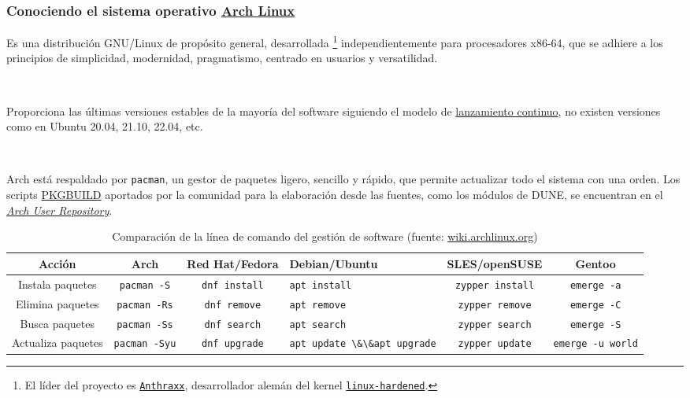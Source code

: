 \begin{frame}
	\frametitle{Conociendo el sistema operativo \href{https://archlinux.org}{Arch Linux}}

	Es una distribución GNU/Linux de propósito general, desarrollada
	\footnote{
		El líder del proyecto es
		\href{https://wiki.archlinux.org/title/User:Anthraxx}{\texttt{Anthraxx}},
		desarrollador alemán del kernel
		\href{https://github.com/anthraxx/linux-hardened}{\texttt{linux-hardened}}.
	}
	independientemente para procesadores x86-64, que se adhiere a los
	principios de simplicidad, modernidad, pragmatismo, centrado en
	usuarios y versatilidad.

	\

	Proporciona las últimas versiones estables de la mayoría del
	software siguiendo el modelo de
	\href{https://en.wikipedia.org/wiki/Rolling\_release}{lanzamiento continuo},
	no existen versiones como en Ubuntu 20.04, 21.10, 22.04, etc.

	\

	Arch está respaldado por \lstinline{pacman}, un gestor de
	paquetes ligero, sencillo y rápido, que permite actualizar todo
	el sistema con una orden.
	Los scripts
	\href{https://wiki.archlinux.org/title/PKGBUILD}{PKGBUILD}
	aportados por la comunidad para la elaboración desde las fuentes,
	como los módulos de DUNE, se encuentran en el
	\href{http://aur.archlinux.org}{\emph{Arch User Repository}}.

	\begin{table}[ht!]
		\caption{Comparación de la línea de comando del gestión de software (fuente: \url{wiki.archlinux.org})}
		\centering\footnotesize
		\begin{tabular}{cccp{50pt}cc}
			\toprule
			Acción             & Arch                    & Red Hat/Fedora          & Debian/Ubuntu                                              & SLES/openSUSE              & Gentoo
			\tabularnewline
			\midrule
			Instala paquetes   & \lstinline|pacman -S|   & \lstinline|dnf install| & \lstinline|apt install|                                    & \lstinline|zypper install| & \lstinline|emerge -a|
			\tabularnewline
			Elimina paquetes   & \lstinline|pacman -Rs|  & \lstinline|dnf remove|  & \lstinline|apt remove|                                     & \lstinline|zypper remove|  & \lstinline|emerge -C|
			\tabularnewline
			Busca paquetes     & \lstinline|pacman -Ss|  & \lstinline|dnf search|  & \lstinline|apt search|                                     & \lstinline|zypper search|  & \lstinline|emerge -S|
			\tabularnewline
			Actualiza paquetes & \lstinline|pacman -Syu| & \lstinline|dnf upgrade| & \lstinline|apt update \&\&|\newline\lstinline|apt upgrade| & \lstinline|zypper update|  & \lstinline|emerge -u world|
			\tabularnewline
			\bottomrule
		\end{tabular}
	\end{table}

\end{frame}

